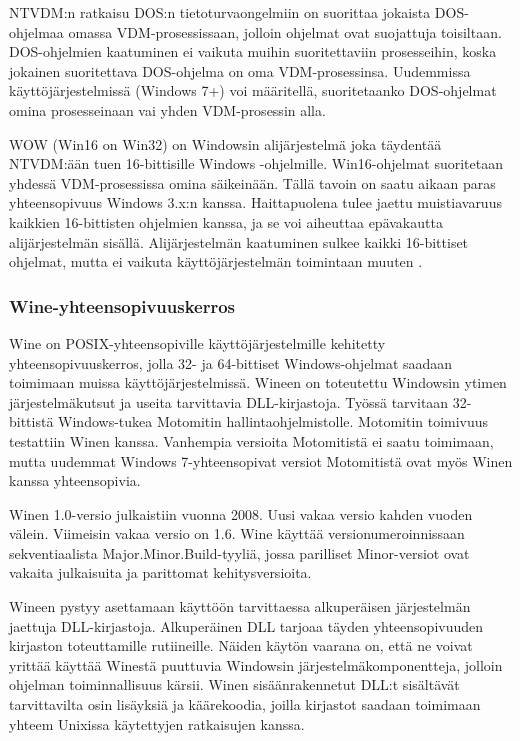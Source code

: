 NTVDM:n ratkaisu DOS:n tietoturvaongelmiin on suorittaa jokaista DOS-ohjelmaa omassa VDM-prosessissaan, jolloin ohjelmat ovat suojattuja toisiltaan. DOS-ohjelmien kaatuminen ei vaikuta muihin suoritettaviin prosesseihin, koska jokainen suoritettava DOS-ohjelma on oma VDM-prosessinsa. Uudemmissa käyttöjärjestelmissä (Windows 7+) voi määritellä, suoritetaanko DOS-ohjelmat omina prosesseinaan vai yhden VDM-prosessin alla.

WOW (Win16 on Win32) on Windowsin alijärjestelmä joka täydentää NTVDM:ään tuen 16-bittisille Windows -ohjelmille. Win16-ohjelmat suoritetaan yhdessä VDM-prosessissa omina säikeinään. Tällä tavoin on saatu aikaan paras yhteensopivuus Windows 3.x:n kanssa. Haittapuolena tulee jaettu muistiavaruus kaikkien 16-bittisten ohjelmien kanssa, ja se voi aiheuttaa epävakautta alijärjestelmän sisällä. Alijärjestelmän kaatuminen sulkee kaikki 16-bittiset ohjelmat, mutta ei vaikuta käyttöjärjestelmän toimintaan muuten \cite{ntvdm_kb}.


\subsubsection{Wine-yhteensopivuuskerros}
Wine on POSIX-yhteensopiville käyttöjärjestelmille kehitetty yhteensopivuuskerros, jolla 32- ja 64-bittiset Windows-ohjelmat saadaan toimimaan muissa käyttöjärjestelmissä. Wineen on toteutettu Windowsin ytimen järjestelmäkutsut ja useita tarvittavia DLL-kirjastoja. Työssä tarvitaan 32-bittistä Windows-tukea Motomitin hallintaohjelmistolle. Motomitin toimivuus testattiin Winen kanssa. Vanhempia versioita Motomitistä ei saatu toimimaan, mutta uudemmat Windows 7-yhteensopivat versiot Motomitistä ovat myös Winen kanssa yhteensopivia.

Winen 1.0-versio julkaistiin vuonna 2008. Uusi vakaa versio kahden vuoden välein. Viimeisin vakaa versio on 1.6. Wine käyttää versionumeroinnissaan sekventiaalista Major.Minor.Build-tyyliä, jossa parilliset Minor-versiot ovat vakaita julkaisuita ja parittomat kehitysversioita.

Wineen pystyy asettamaan käyttöön tarvittaessa alkuperäisen järjestelmän jaettuja DLL-kirjastoja. Alkuperäinen DLL tarjoaa täyden yhteensopivuuden kirjaston toteuttamille rutiineille. Näiden käytön vaarana on, että ne voivat yrittää käyttää Winestä puuttuvia Windowsin järjestelmäkomponentteja, jolloin ohjelman toiminnallisuus kärsii. Winen sisäänrakennetut DLL:t sisältävät tarvittavilta osin lisäyksiä ja käärekoodia, joilla kirjastot saadaan toimimaan yhteem Unixissa käytettyjen ratkaisujen kanssa.

